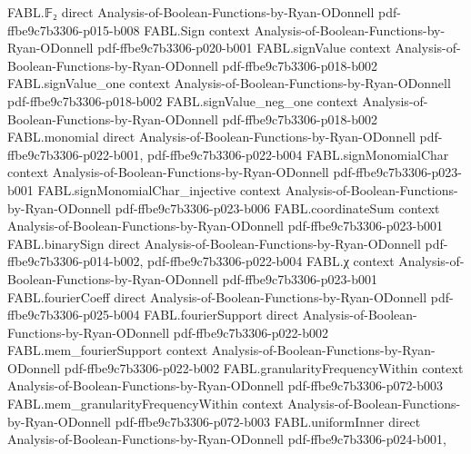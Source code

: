\begin{theorem}
\label{FABL.tribesCriticalWidthError_isLittleO_one}
\leanok
{}
\proofstep
  {FABL.𝔽₂}
  {direct}
  {Analysis-of-Boolean-Functions-by-Ryan-ODonnell}
  {pdf-ffbe9c7b3306-p015-b008}
\proofstep
  {FABL.Sign}
  {context}
  {Analysis-of-Boolean-Functions-by-Ryan-ODonnell}
  {pdf-ffbe9c7b3306-p020-b001}
\proofstep
  {FABL.signValue}
  {context}
  {Analysis-of-Boolean-Functions-by-Ryan-ODonnell}
  {pdf-ffbe9c7b3306-p018-b002}
\proofstep
  {FABL.signValue_one}
  {context}
  {Analysis-of-Boolean-Functions-by-Ryan-ODonnell}
  {pdf-ffbe9c7b3306-p018-b002}
\proofstep
  {FABL.signValue_neg_one}
  {context}
  {Analysis-of-Boolean-Functions-by-Ryan-ODonnell}
  {pdf-ffbe9c7b3306-p018-b002}
\proofstep
  {FABL.monomial}
  {direct}
  {Analysis-of-Boolean-Functions-by-Ryan-ODonnell}
  {pdf-ffbe9c7b3306-p022-b001,
    pdf-ffbe9c7b3306-p022-b004}
\proofstep
  {FABL.signMonomialChar}
  {context}
  {Analysis-of-Boolean-Functions-by-Ryan-ODonnell}
  {pdf-ffbe9c7b3306-p023-b001}
\proofstep
  {FABL.signMonomialChar_injective}
  {context}
  {Analysis-of-Boolean-Functions-by-Ryan-ODonnell}
  {pdf-ffbe9c7b3306-p023-b006}
\proofstep
  {FABL.coordinateSum}
  {context}
  {Analysis-of-Boolean-Functions-by-Ryan-ODonnell}
  {pdf-ffbe9c7b3306-p023-b001}
\proofstep
  {FABL.binarySign}
  {direct}
  {Analysis-of-Boolean-Functions-by-Ryan-ODonnell}
  {pdf-ffbe9c7b3306-p014-b002,
    pdf-ffbe9c7b3306-p022-b004}
\proofstep
  {FABL.χ}
  {context}
  {Analysis-of-Boolean-Functions-by-Ryan-ODonnell}
  {pdf-ffbe9c7b3306-p023-b001}
\proofstep
  {FABL.fourierCoeff}
  {direct}
  {Analysis-of-Boolean-Functions-by-Ryan-ODonnell}
  {pdf-ffbe9c7b3306-p025-b004}
\proofstep
  {FABL.fourierSupport}
  {direct}
  {Analysis-of-Boolean-Functions-by-Ryan-ODonnell}
  {pdf-ffbe9c7b3306-p022-b002}
\proofstep
  {FABL.mem_fourierSupport}
  {context}
  {Analysis-of-Boolean-Functions-by-Ryan-ODonnell}
  {pdf-ffbe9c7b3306-p022-b002}
\proofstep
  {FABL.granularityFrequencyWithin}
  {context}
  {Analysis-of-Boolean-Functions-by-Ryan-ODonnell}
  {pdf-ffbe9c7b3306-p072-b003}
\proofstep
  {FABL.mem_granularityFrequencyWithin}
  {context}
  {Analysis-of-Boolean-Functions-by-Ryan-ODonnell}
  {pdf-ffbe9c7b3306-p072-b003}
\proofstep
  {FABL.uniformInner}
  {direct}
  {Analysis-of-Boolean-Functions-by-Ryan-ODonnell}
  {pdf-ffbe9c7b3306-p024-b001,
}
\end{theorem}
